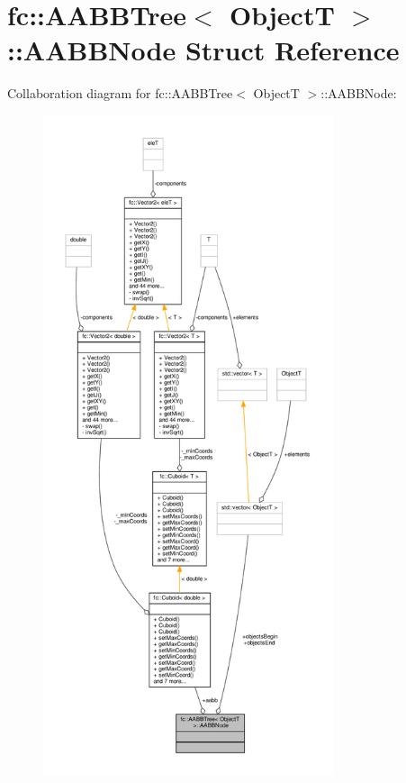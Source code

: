 \hypertarget{structfc_1_1AABBTree_1_1AABBNode}{}\section{fc\+:\+:A\+A\+B\+B\+Tree$<$ ObjectT $>$\+:\+:A\+A\+B\+B\+Node Struct Reference}
\label{structfc_1_1AABBTree_1_1AABBNode}


Collaboration diagram for fc\+:\+:A\+A\+B\+B\+Tree$<$ ObjectT $>$\+:\+:A\+A\+B\+B\+Node\+:
\nopagebreak
\begin{figure}[H]
\begin{center}
\leavevmode
\includegraphics[height=550pt]{d6/d9a/structfc_1_1AABBTree_1_1AABBNode__coll__graph}
\end{center}
\end{figure}
